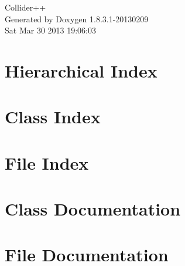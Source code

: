 \documentclass{book}
\begin{document}
\hypersetup{pageanchor=false,citecolor=blue}
\begin{titlepage}
\vspace*{7cm}
\begin{center}
{\Large Collider++ }\\
\vspace*{1cm}
{\large Generated by Doxygen 1.8.3.1-20130209}\\
\vspace*{0.5cm}
{\small Sat Mar 30 2013 19:06:03}\\
\end{center}
\end{titlepage}
\clearemptydoublepage
{}
\tableofcontents
\clearemptydoublepage
{}
\hypersetup{pageanchor=true,citecolor=blue}
\chapter{Hierarchical Index}

\chapter{Class Index}

\chapter{File Index}

\chapter{Class Documentation}








\chapter{File Documentation}






\printindex
\end{document}
